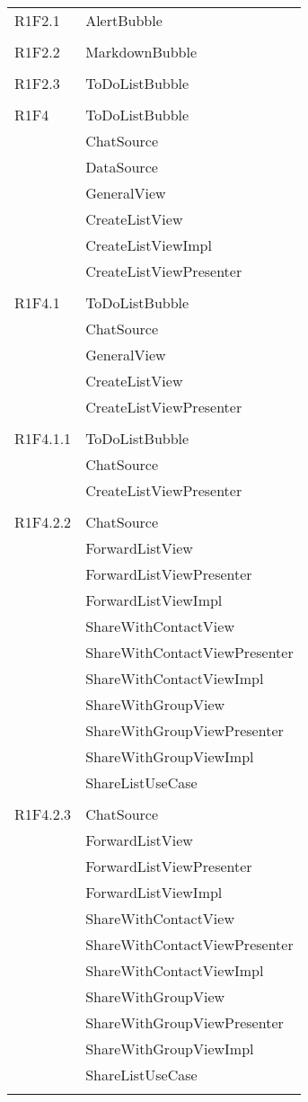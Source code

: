 \begin{center}
\begin{longtable}{|p{7cm}|p{5cm}|}
		R1F2.1 & AlertBubble \\ & \\ \hline
		R1F2.2 & MarkdownBubble \\ & \\ \hline
		R1F2.3 & ToDoListBubble \\ & \\ \hline
		R1F4 & ToDoListBubble \\ & ChatSource \\ & DataSource \\ & GeneralView \\ & CreateListView \\ & CreateListViewImpl \\ & CreateListViewPresenter \\ & \\ \hline
		R1F4.1 & ToDoListBubble \\ & ChatSource \\ & GeneralView \\ & CreateListView \\ & CreateListViewPresenter \\ & \\ \hline
		R1F4.1.1 & ToDoListBubble \\ & ChatSource \\ & CreateListViewPresenter \\ & \\ \hline
		R1F4.2.2 & ChatSource \\ & ForwardListView \\ & ForwardListViewPresenter \\ & ForwardListViewImpl \\ & ShareWithContactView \\ & ShareWithContactViewPresenter \\ & ShareWithContactViewImpl \\ & ShareWithGroupView \\ & ShareWithGroupViewPresenter \\ & ShareWithGroupViewImpl \\ & ShareListUseCase \\ & \\ \hline
		R1F4.2.3 & ChatSource \\ & ForwardListView \\ & ForwardListViewPresenter \\ & ForwardListViewImpl \\ & ShareWithContactView \\ & ShareWithContactViewPresenter \\ & ShareWithContactViewImpl \\ & ShareWithGroupView \\ & ShareWithGroupViewPresenter \\ & ShareWithGroupViewImpl \\ & ShareListUseCase \\ & \\ \hline

\end{longtable}
\end{center}

